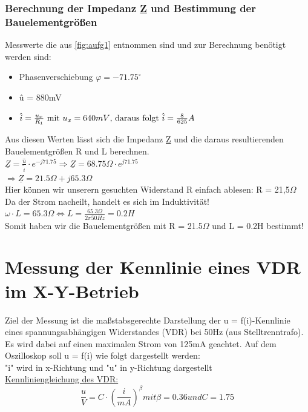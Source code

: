\documentclass[11pt,a4paper,titlepage]{article}
\begin{document}
\subsubsection{Berechnung der Impedanz \underline{Z} und Bestimmung der Bauelementgr\"o\ss{}en}
Messwerte die aus \ref{fig:aufg1} entnommen sind und zur Berechnung ben\"otigt werden sind:
\begin{itemize}
\item Phasenverschiebung $\varphi = -71.75^\circ$
\item \^u = 880mV
\item \(\hat{i} = \frac{u_x}{R_1}$ mit $u_x = 640mV$, daraus folgt $\hat{i} = \frac{8}{625}A\) 
\end{itemize}  
Aus diesen Werten l\"asst sich die Impedanz \underline{Z} und die daraus resultierenden Bauelementgr\"o\ss{}en R und L berechnen. \\[1ex]
\(\underline{Z} = \frac{\hat{u}}{\hat{i}} \cdot e^{-j71.75} \Rightarrow \underline{Z} = 68.75\Omega \cdot e^{j71.75}\) \\[1ex]
$\Rightarrow \underline{Z} = 21.5\Omega + j65.3\Omega$ \\[1ex]
Hier k\"onnen wir unserern gesuchten Widerstand R einfach ablesen: R = 21,5$\Omega$ \\[1ex]
Da der Strom nacheilt, handelt es sich im Induktivit\"at! \\[1ex]
$\omega \cdot L = 65.3\Omega \Leftrightarrow L = \frac{65.3\Omega}{2\pi50Hz} = 0.2H$ \\[1ex]
Somit haben wir die Bauelementgr\"o\ss{}en mit R = 21.5$\Omega$ und L = 0.2H bestimmt!
\newpage
\section{Messung der Kennlinie eines VDR im X-Y-Betrieb}
Ziel der Messung ist die ma\ss{}stabsgerechte Darstellung der u = f(i)-Kennlinie eines spannungsabh\"angigen Widerstandes (VDR) bei 50Hz (aus Stelltrenntrafo). Es wird dabei auf einen maximalen Strom von 125mA geachtet. Auf dem Oszilloskop soll u = f(i) wie folgt dargestellt werden: \\[1ex] 
"i" wird in x-Richtung und "u" in y-Richtung dargestellt \\

\underline{Kennliniengleichung des VDR:} \\[1ex]
\begin{equation}\label{vdr}
\frac{u}{V}=C\cdot(\frac{i}{mA})^{\beta} mit \beta = 0.36 und C = 1.75 
\end{equation}
\end{document}
